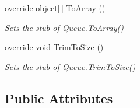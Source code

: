 \begin{DoxyCompactItemize}
override object\mbox{[}$\,$\mbox{]} \hyperlink{class_system_1_1_collections_1_1_fakes_1_1_stub_queue_a12da02bbbd7cf9156ed0209f93d6caaf}{To\-Array} ()
\begin{DoxyCompactList}\small\item\em Sets the stub of Queue.\-To\-Array()\end{DoxyCompactList}\item 
override void \hyperlink{class_system_1_1_collections_1_1_fakes_1_1_stub_queue_a30d6fc92193ac94bbcc0f6d463f2ad7f}{Trim\-To\-Size} ()
\begin{DoxyCompactList}\small\item\em Sets the stub of Queue.\-Trim\-To\-Size()\end{DoxyCompactList}\end{DoxyCompactItemize}
\subsection*{Public Attributes}
